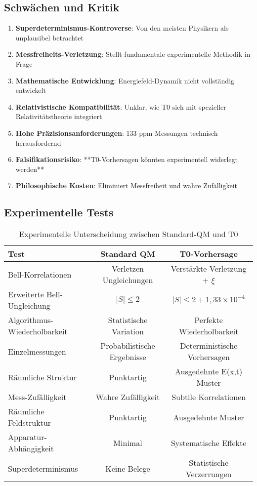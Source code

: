 \documentclass[12pt,a4paper]{article}
\newcommand{\xipar}{\xi}
\begin{document}
	\subsection{Schwächen und Kritik}
	
	\begin{enumerate}
		\item \textbf{Superdeterminismus-Kontroverse}: Von den meisten Physikern als unplausibel betrachtet
		\item \textbf{Messfreiheits-Verletzung}: Stellt fundamentale experimentelle Methodik in Frage
		\item \textbf{Mathematische Entwicklung}: Energiefeld-Dynamik nicht vollständig entwickelt
		\item \textbf{Relativistische Kompatibilität}: Unklar, wie T0 sich mit spezieller Relativitätstheorie integriert
		\item \textbf{Hohe Präzisionsanforderungen}: 133 ppm Messungen technisch herausfordernd
		\item \textbf{Falsifikationsrisiko}: **T0-Vorhersagen könnten experimentell widerlegt werden**
		\item \textbf{Philosophische Kosten}: Eliminiert Messfreiheit und wahre Zufälligkeit
	\end{enumerate}
	
	\subsection{Experimentelle Tests}
	
	\begin{table}[htbp]
		\centering
		\begin{tabular}{lcc}
			\toprule
			\textbf{Test} & \textbf{Standard QM} & \textbf{T0-Vorhersage} \\
			\midrule
			Bell-Korrelationen & Verletzen Ungleichungen & Verstärkte Verletzung + $\xipar$ \\
			Erweiterte Bell-Ungleichung & $|S| \leq 2$ & $|S| \leq 2 + 1,33 \times 10^{-4}$ \\
			Algorithmus-Wiederholbarkeit & Statistische Variation & Perfekte Wiederholbarkeit \\
			Einzelmessungen & Probabilistische Ergebnisse & Deterministische Vorhersagen \\
			Räumliche Struktur & Punktartig & Ausgedehnte E(x,t) Muster \\
			Mess-Zufälligkeit & Wahre Zufälligkeit & Subtile Korrelationen \\
			Räumliche Feldstruktur & Punktartig & Ausgedehnte Muster \\
			Apparatur-Abhängigkeit & Minimal & Systematische Effekte \\
			Superdeterminismus & Keine Belege & Statistische Verzerrungen \\
			\bottomrule
		\end{tabular}
		\caption{Experimentelle Unterscheidung zwischen Standard-QM und T0}
	\end{table}
	
\end{document}
